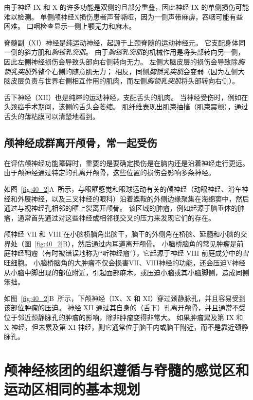 由于神经 IX 和 X 的许多功能是双侧的且部分重叠，因此神经 IX 的单侧损伤可能难以检测。
单侧颅神经X损伤患者声音嘶哑，因为一侧声带麻痹，吞咽可能有些困难。
口咽检查显示一侧上颚无力和麻木。


脊髓副（XI）神经是纯运动神经，起源于上颈脊髓的运动神经元。
它支配身体同一侧的斜方肌和\textit{胸锁乳突肌}。
由于\textit{胸锁乳突肌}的机械作用是将头部转向另一侧，因此左侧神经损伤会导致头部向右侧转向无力。
左侧大脑皮层的损伤会导致除\textit{胸锁乳突肌}外整个右侧的随意肌无力；
相反，同侧\textit{胸锁乳突肌}会变弱（因为左侧大脑皮层负责与世界右侧相互作用的肌肉，而左侧\textit{胸锁乳突肌}将头部转向右侧）。


舌下神经（XII）也是纯粹的运动神经，支配舌头的肌肉。
当神经受伤时，例如在头颈癌手术期间，该侧的舌头会萎缩。
肌纤维表现出肌束抽搐（肌束震颤），通过舌头的薄粘膜可以清楚地看到。



\subsection{颅神经成群离开颅骨，常一起受伤}

在评估颅神经功能障碍时，重要的是要确定损伤是在脑内还是沿着神经走行更远。
由于颅神经通过特定的孔离开颅骨，这些位置的损伤会影响多条神经。


如图~\ref{fig:40_2}A~所示，与眼眶感觉和眼球运动有关的颅神经（动眼神经、滑车神经和外展神经，以及三叉神经的眼科）沿着蝶鞍的外侧边缘聚集在海绵窦中，然后通过与视神经孔相邻的眶上裂离开颅骨。
该区域的肿瘤，例如起源于脑垂体的肿瘤，通常首先通过对这些神经或相邻视交叉的压力来发现它们的存在。


颅神经 VII 和 VIII 在小脑桥脑角出脑干，脑干的外侧角在桥脑、延髓和小脑的交界处（图~\ref{fig:40_2}B），然后通过内耳道离开颅骨。
小脑桥脑角的常见肿瘤是前庭神经鞘瘤（有时被错误地称为“听神经瘤”），它起源于神经 VIII 前庭成分中的雪旺细胞。
小脑桥脑角的大肿瘤不仅会损害VII、VIII神经的功能，还会压迫V神经从小脑中脚出现的部位附近，引起面部麻木，或压迫小脑或其小脑脚侧，造成同侧笨拙。


如图~\ref{fig:40_2}B~所示，下颅神经（IX、X 和 XI）穿过颈静脉孔，并且容易受到该部位肿瘤的压迫。
神经 XII 通过其自身的（舌下）孔离开颅骨，并且通常不受位于邻近颈静脉孔的肿瘤的影响，除非肿瘤变得非常大。
如果肿瘤累及第 IX 和 X 神经，但未累及第 XI 神经，则它通常位于脑干内或脑干附近，而不是靠近颈静脉孔。



\section{颅神经核团的组织遵循与脊髓的感觉区和运动区相同的基本规划}

